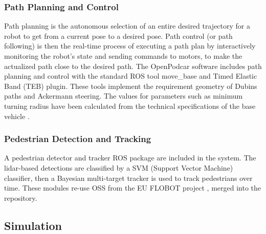 \documentclass[a4paper]{article}
\begin{document}
	
	\subsubsection{Path Planning and Control}
	
	Path planning is the autonomous selection of an entire desired trajectory for a robot to get from a current pose to a desired pose. Path control (or path following) is then the real-time process of executing a path plan by interactively monitoring the robot’s state and sending commands to motors, to make the actualized path close to the desired path. The OpenPodcar software includes path planning and control with the standard ROS tool move\_base and Timed Elastic Band (TEB) \cite{rosmann2013efficient} plugin. These tools implement the requirement geometry of Dubins paths \cite{dubins1957curves} and Ackermann steering. The values for parameters such as minimum turning radius have been calculated from the technical specifications of the base vehicle \cite{shoprider2016shoprider}.
	
	\subsubsection{Pedestrian Detection and Tracking}
	
	A pedestrian detector and tracker ROS package are included in the system.  The lidar-based detections are classified by a SVM (Support Vector Machine) classifier, then a Bayesian multi-target tracker is used to track pedestrians over time. These modules re-use OSS from the EU FLOBOT project \cite{yan2020robot}, merged into the repository.
	
	
	\subsection{Simulation}
	
\end{document}
